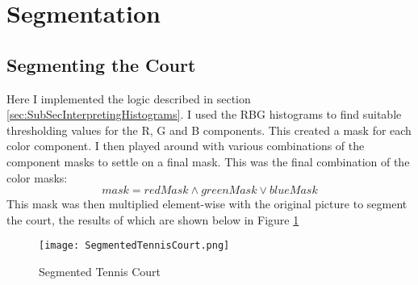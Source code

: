 \section{Segmentation}
\subsection{Segmenting the Court}
Here I implemented the logic described in section \ref{sec:SubSecInterpretingHistograms}. I used the RBG histograms to find suitable thresholding values for the R, G and B components. This created a mask for each color component. I then played around with various combinations of the component masks to settle on a final mask. This was the final combination of the color masks:
\[ mask = redMask \land greenMask \lor blueMask\]
This mask was then multiplied element-wise with the original picture to segment the court, the results of which are shown below in Figure \ref{fig:SegmentedTennisCourt}

\begin{figure}[!h]
    \texttt{[image: SegmentedTennisCourt.png]}
    \centering
    \caption{Segmented Tennis Court}
    \label{fig:SegmentedTennisCourt}
\end{figure}